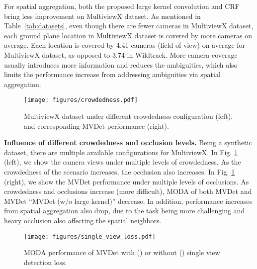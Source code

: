 \documentclass[runningheads]{llncs}
\begin{document}
For spatial aggregation, both the proposed large kernel convolution and CRF bring less improvement on MultiviewX dataset. 
As mentioned in Table~\ref{tab:datasets}, even though there are fewer cameras in MultiviewX dataset, 
each ground plane location in MultiviewX dataset is covered by more cameras on average. Each location is covered by 4.41 cameras (field-of-view) on average for MultiviewX dataset, as opposed to 3.74 in Wildtrack. More camera coverage usually introduces more information and reduces the ambiguities, which also limits the performance increase from addressing ambiguities via spatial aggregation. 




\begin{figure}[t]
    \texttt{[image: figures/crowdedness.pdf]}
    \caption{MultiviewX dataset under different crowdedness configuration (left), and corresponding MVDet performance (right). 
    }
    \label{fig:crowdedness}
\end{figure}

\textbf{Influence of different crowdedness and occlusion levels. }
Being a synthetic dataset, there are multiple available configurations for MultiviewX. In Fig. \ref{fig:crowdedness} (left), we show the camera views under multiple levels of crowdedness. As the crowdedness of the scenario increases, the occlusion also increases. In Fig. \ref{fig:crowdedness} (right), we show the MVDet performance under multiple levels of occlusions. As crowdedness and occlusions increase (more difficult), MODA of both MVDet and MVDet ``MVDet (w/o large kernel)'' decrease. In addition, performance increases from spatial aggregation also drop, due to the task being more challenging and heavy occlusion also affecting the spatial neighbors. 


\begin{wrapfigure}{l}{0.4\textwidth}
    \centering
    \texttt{[image: figures/single\_view\_loss.pdf]}
    \caption{MODA performance of MVDet with () or without () single view detection loss. 
    }
    \label{fig:single_view_loss}
\end{wrapfigure}
\end{document}
